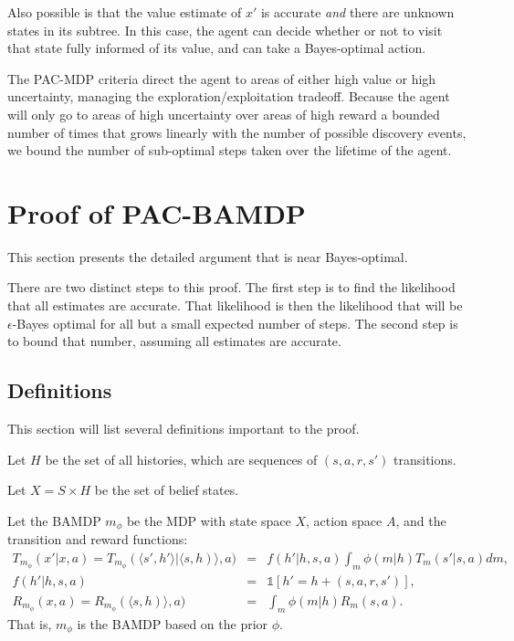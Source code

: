 \begin{proofsketch}
Also possible is that the value estimate of $x'$ is accurate \emph{and} there are unknown states in its subtree. In this case, the agent can decide whether or not to visit that state fully informed of its value, and can take a Bayes-optimal action.

The PAC-MDP criteria direct the agent to areas of either high value or high uncertainty, managing the exploration/exploitation tradeoff. Because the agent will only go to areas of high uncertainty over areas of high reward a bounded number of times that grows linearly with the number of possible discovery events, we bound the number of sub-optimal steps taken over the lifetime of the agent.
\end{proofsketch}


\section{Proof of PAC-BAMDP}

This section presents the detailed argument that  is near
Bayes-optimal.

There are two distinct steps to this proof. The first step is to find the likelihood that all estimates are accurate. That likelihood is then the likelihood that  will be $\epsilon$-Bayes optimal for all but a small expected number of steps. The second step is to bound that number, assuming all estimates are accurate.

\subsection{Definitions}

This section will list several definitions important to the proof.

\begin{defn}
Let $H$ be the set of all histories, which are sequences of $(s,a,r,s')$ transitions.
\end{defn}

\begin{defn}
Let $X=S\times H$ be the set of belief states.
\end{defn}

\begin{defn}
Let the BAMDP $m_\phi$ be the MDP with state space $X$, action space $A$, and the transition and reward functions:
\begin{eqnarray}
T_{m_\phi}(x'|x,a)= T_{m_\phi}(\langle s', h'\rangle|\langle s, h)\rangle, a) &=& f(h'|h,s,a) \int_m \phi(m|h)T_m(s'|s,a) dm,\\
f(h'|h,s,a) &=& \mathbb{1}[h'=h+(s,a,r,s')],\\
R_{m_\phi}(x,a) = R_{m_\phi}(\langle s, h)\rangle, a) &=& \int_m \phi(m|h) R_m(s,a).
\end{eqnarray}
That is, $m_\phi$ is the BAMDP based on the prior $\phi$.
\end{defn}

